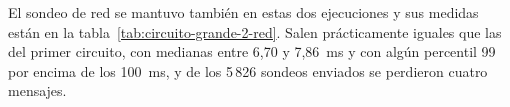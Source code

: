 El sondeo de red se mantuvo también en estas dos ejecuciones y sus medidas están en la tabla~\ref{tab:circuito-grande-2-red}. Salen prácticamente iguales que las del primer circuito, con medianas entre 6,70 y 7,86~ms y con algún percentil 99 por encima de los 100~ms, y de los 5\,826 sondeos enviados se perdieron cuatro mensajes.

